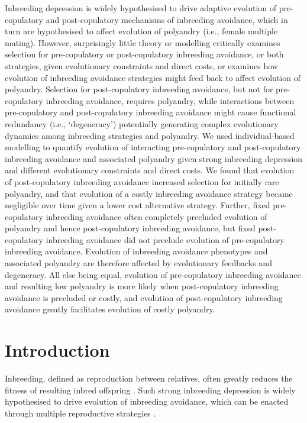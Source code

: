 \documentclass[12pt]{article}
\begin{document}
Inbreeding depression is widely hypothesised to drive adaptive evolution of pre-copulatory and post-copulatory mechanisms of inbreeding avoidance, which in turn are hypothesised to affect evolution of polyandry (i.e., female multiple mating). However, surprisingly little theory or modelling critically examines selection for pre-copulatory or post-copulatory inbreeding avoidance, or both strategies, given evolutionary constraints and direct costs, or examines how evolution of inbreeding avoidance strategies might feed back to affect evolution of polyandry. Selection for post-copulatory inbreeding avoidance, but not for pre-copulatory inbreeding avoidance, requires polyandry, while interactions between pre-copulatory and post-copulatory inbreeding avoidance might cause functional redundancy (i.e., `degeneracy') potentially generating complex evolutionary dynamics among inbreeding strategies and polyandry. We used individual-based modelling to quantify evolution of interacting pre-copulatory and post-copulatory inbreeding avoidance and associated polyandry given strong inbreeding depression and different evolutionary constraints and direct costs. We found that evolution of post-copulatory inbreeding avoidance increased selection for initially rare polyandry, and that evolution of a costly inbreeding avoidance strategy became negligible over time given a lower cost alternative strategy. Further, fixed pre-copulatory inbreeding avoidance often completely precluded evolution of polyandry and hence post-copulatory inbreeding avoidance, but fixed post-copulatory inbreeding avoidance did not preclude evolution of pre-copulatory inbreeding avoidance. Evolution of inbreeding avoidance phenotypes and associated polyandry are therefore affected by evolutionary feedbacks and degeneracy. All else being equal, evolution of pre-copulatory inbreeding avoidance and resulting low polyandry is more likely when post-copulatory inbreeding avoidance is precluded or costly, and evolution of post-copulatory inbreeding avoidance greatly facilitates evolution of costly polyandry.

\clearpage

\section*{Introduction}

Inbreeding, defined as reproduction between relatives, often greatly reduces the fitness of resulting inbred offspring \cite[termed `inbreeding depression';][]{Charlesworth1999, Keller2002, Charlesworth2009}. Such strong inbreeding depression is widely hypothesised to drive evolution of inbreeding avoidance, which can be enacted through multiple reproductive strategies \cite[][]{Parker1979, Parker2006, Pusey1996, Szulkin2012}. 
\end{document}
